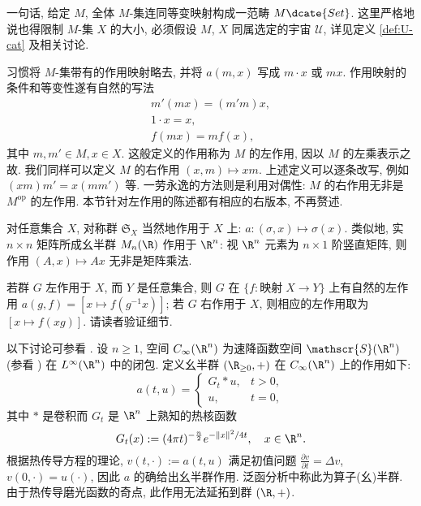 \begin{remark}
	一句话, 给定 $M$, 全体 $M$-集连同等变映射构成一范畴 $M\dcate{Set}$. 这里严格地说也得限制 $M$-集 $X$ 的大小, 必须假设 $M$, $X$ 同属选定的宇宙 $\mathcal{U}$, 详见定义 \ref{def:U-cat} 及相关讨论.
\end{remark}


习惯将 $M$-集带有的作用映射略去, 并将 $a(m, x)$ 写成 $m \cdot x$ 或 $mx$. 作用映射的条件和等变性遂有自然的写法
\begin{gather*}
	m'(mx) = (m'm)x, \\
	1 \cdot x = x, \\
	f(mx) = mf(x),
\end{gather*}
其中 $ m, m' \in M, x \in X$. 这般定义的作用称为 $M$ 的左作用, 因以 $M$ 的左乘表示之故. 我们同样可以定义 $M$ 的右作用 $(x, m) \mapsto xm$. 上述定义可以逐条改写, 例如 $(xm)m' = x(mm')$ 等. 一劳永逸的方法则是利用对偶性: $M$ 的右作用无非是 $M^\text{op}$ 的左作用. 本节针对左作用的陈述都有相应的右版本, 不再赘述.

\begin{example}
	对任意集合 $X$, 对称群 $\mathfrak{S}_X$ 当然地作用于 $X$ 上: $a: (\sigma, x) \mapsto \sigma(x)$. 类似地, 实 $n \times n$ 矩阵所成幺半群 $M_n(\R)$ 作用于 $\R^n$: 视 $\R^n$ 元素为 $n \times 1$ 阶竖直矩阵, 则作用 $(A, x) \mapsto A x$ 无非是矩阵乘法.
\end{example}

\begin{example}
	若群 $G$ 左作用于 $X$, 而 $Y$ 是任意集合, 则 $G$ 在 $\{f: \text{映射}\; X \to Y \}$ 上有自然的左作用 $a(g,f) = \left[ x \mapsto f(g^{-1}x) \right]$; 若 $G$ 右作用于 $X$, 则相应的左作用取为 $[x \mapsto f(xg)]$. 请读者验证细节.
\end{example}

\begin{example}
	以下讨论可参看 \cite[例 7.2.4]{Zh2}. 设 $n \geq 1$, 空间 $C_\infty(\R^n)$ 为速降函数空间 $\mathscr{S}(\R^n)$ (参看 \cite[例 3.2.7]{Zh1}) 在 $L^\infty(\R^n)$  中的闭包. 定义幺半群 $(\R_{\geq 0}, +)$ 在 $C_\infty(\R^n)$ 上的作用如下:
	\[ a(t, u) =
		\begin{cases}
			G_t \ast u, & t > 0, \\
			u, & t=0,
		\end{cases}\]
	其中 $\ast$ 是卷积而 $G_t$ 是 $\R^n$ 上熟知的热核函数
	\[ G_t(x) := (4\pi t)^{-\frac{n}{2}} e^{-\|x\|^2 /4t}, \quad x \in \R^n. \]
	根据热传导方程的理论, $v(t, \cdot) := a(t, u)$ 满足初值问题 $\frac{\partial v}{\partial t} = \Delta v$, $v(0, \cdot) = u(\cdot)$, 因此 $a$ 的确给出幺半群作用. 泛函分析中称此为算子(幺)半群. 由于热传导磨光函数的奇点, 此作用无法延拓到群 $(\R, +)$.
\end{example}

